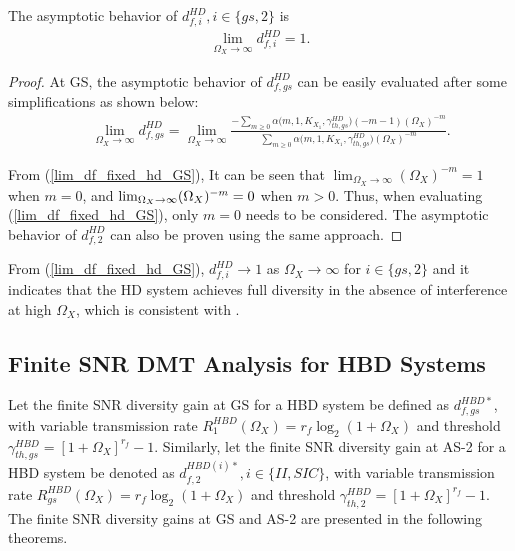 \begin{corollary}
The asymptotic behavior of $d_{f,i}^{HD}, i \in \{gs,2\}$ is
\begin{eqnarray} \label{lim_df_fixed_hd}
\lim_{\Omega_X \to \infty} d_{f,i}^{HD} = 1. 
\end{eqnarray}
\end{corollary}
\begin{proof}
At GS, the asymptotic behavior of $d_{f,gs}^{HD}$ can be easily evaluated after some simplifications as shown below:
\begin{eqnarray} \label{lim_df_fixed_hd_GS}
&& \lim_{\Omega_X \to \infty} d_{f,gs}^{HD} = \lim_{\Omega_X \to \infty} \frac{ -\sum_{m\geq0} \alpha\big(m,1,K_{X_1},\gamma_{th,gs}^{HD}\big) (-m-1) (\Omega_{X})^{-m} }{\sum_{m\geq0} \alpha\big(m,1,K_{X_1},\gamma_{th,gs}^{HD}\big) (\Omega_{X})^{-m} }. 
\end{eqnarray}

From (\ref{lim_df_fixed_hd_GS}), It can be seen that $\lim_{\Omega_X\to\infty} (\Omega_{X})^{-m}=1 $ when $m=0$, and $\lim_{\Omega_X\to\infty} (\Omega_{X})^{-m} \\ = 0 $ when $m>0$. Thus, when evaluating (\ref{lim_df_fixed_hd_GS}), only $m=0$ needs to be considered. The asymptotic behavior of $d_{f,2}^{HD}$ can also be proven using the same approach.
\end{proof}


From (\ref{lim_df_fixed_hd_GS}), $d_{f,i}^{HD} \to 1$ as $\Omega_X \to \infty$ for $i \in \{gs,2\}$ and it indicates that the HD system achieves full diversity in the absence of interference at high $\Omega_X$, which is consistent with \cite[Fig. 3]{shin2008diversity}.

\subsection{Finite SNR DMT Analysis for HBD Systems}

Let the finite SNR diversity gain at GS for a HBD system be defined as $d_{f,gs}^{HBD*}$, with variable transmission rate $R_1^{HBD}(\Omega_X)=r_f\log_2(1+\Omega_X)$ and threshold $\gamma_{th,gs}^{HBD} = [1+\Omega_X]^{r_f}-1$. Similarly, let the finite SNR diversity gain at AS-2 for a HBD system be denoted as $d_{f,2}^{HBD(i)*}, i \in \{II,SIC\}$, with variable transmission rate $R_{gs}^{HBD}(\Omega_X)=r_f\log_2(1+\Omega_X)$ and threshold $\gamma_{th,2}^{HBD} = [1+\Omega_X]^{r_f}-1$. The finite SNR diversity gains at GS and AS-2 are presented in the following theorems.

